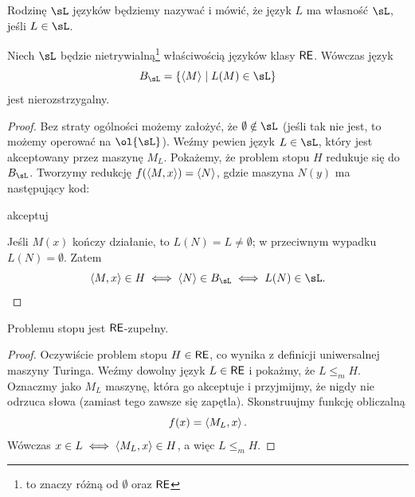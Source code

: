 Rodzinę $\sL$ języków będziemy nazywać  i mówić, że język $L$ ma własność $\sL$, jeśli $L \in \sL$.

\begin{theorem}[Rice'a]
    Niech $\sL$ będzie nietrywialną\footnote{to znaczy różną od $\emptyset$ oraz $\textsf{RE}$} właściwością języków klasy $\textsf{RE}$. Wówczas język
    \[ B_\sL = \{\encode{M} \mid L(M) \in \sL\} \]
    jest nierozstrzygalny.
\end{theorem}
\begin{proof}
    Bez straty ogólności możemy założyć, że $\emptyset \notin \sL$ (jeśli tak nie jest, to możemy operować na $\ol{\sL}$). Weźmy pewien język $L \in \sL$, który jest akceptowany przez maszynę $M_L$. Pokażemy, że problem stopu $H$ redukuje się do $B_\sL$. Tworzymy redukcję $f(\left\langle M, x \right\rangle) = \left\langle N \right\rangle$, gdzie maszyna $N(y)$ ma następujący kod:
    \begin{algorithmic}
                \State akceptuj
            \EndIf
        \EndIf
    \end{algorithmic}
    Jeśli $M(x)$ kończy działanie, to $L(N) = L \neq \emptyset$; w przeciwnym wypadku $L(N) = \emptyset$. Zatem
    \[ \encode{M, x} \in H \iff \encode{N} \in B_\sL \iff L(N) \in \sL. \]
\end{proof}

\begin{theorem}
    Problemu stopu jest $\textsf{RE}$-zupełny.
\end{theorem}
\begin{proof}
    Oczywiście problem stopu $H \in \textsf{RE}$, co wynika z definicji uniwersalnej maszyny Turinga. Weźmy dowolny język $L \in \textsf{RE}$ i pokażmy, że $L \leq_m H$. Oznaczmy jako $M_L$ maszynę, która go akceptuje i przyjmijmy, że nigdy nie odrzuca słowa (zamiast tego zawsze się zapętla). Skonstruujmy funkcję obliczalną
    \[ f(x) = \left\langle M_L, x \right\rangle. \]
    Wówczas $x \in L \iff \left\langle M_L, x \right\rangle \in H$, a więc $L \leq_m H$.
\end{proof}

